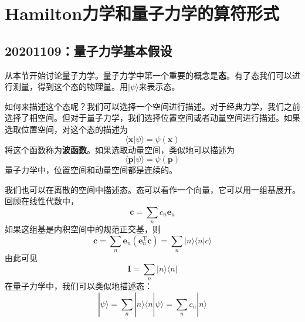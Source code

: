 \chapter{Hamilton力学和量子力学的算符形式}
    \section{20201109：量子力学基本假设}
        从本节开始讨论量子力学。量子力学中第一个重要的概念是\textbf{态}。有了态我们可以进行测量，得到这个态的物理量。用$| \psi \rangle$来表示态。

        如何来描述这个态呢？我们可以选择一个空间进行描述。对于经典力学，我们之前选择了相空间。但对于量子力学，我们选择位置空间或者动量空间进行描述。如果选取位置空间，对这个态的描述为
        \begin{equation*}
            \langle \bm{x} | \psi \rangle = \psi(\bm{x})
        \end{equation*}
        将这个函数称为\textbf{波函数}。如果选取动量空间，类似地可以描述为
        \begin{equation*}
            \langle \bm{p} | \psi \rangle = \psi(\bm{p})
        \end{equation*}
        量子力学中，位置空间和动量空间都是连续的。

        我们也可以在离散的空间中描述态。态可以看作一个向量，它可以用一组基展开。回顾在线性代数中，
        \begin{equation*}
            \bm{c} = \sum_n c_n \bm{e}_n
        \end{equation*}
        如果这组基是内积空间中的规范正交基，则
        \begin{equation*}
            \bm{c} = \sum_n \bm{e}_n (\bm{e}_n^\mathrm{T}\bm{c}) 
            = \sum_n |n\rangle \langle n|c\rangle
        \end{equation*}
        由此可见
        \begin{equation*}
            \bm{I} = \sum_n |n\rangle \langle n|
        \end{equation*}
        在量子力学中，我们可以类似地描述态：
        \begin{equation*}
            |\psi \rangle = \sum_n |n\rangle \langle n|\psi \rangle = \sum_n c_n |n\rangle
        \end{equation*}


